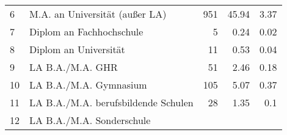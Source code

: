 \begin{longtable}{lXrrr}
     6 &
     \multicolumn{1}{X}{ M.A. an Universität (außer LA)   } &


       \num{951} &
       \num[round-mode=places,round-precision=2]{45,94} &
         \num[round-mode=places,round-precision=2]{3,37} \\

     7 &
     \multicolumn{1}{X}{ Diplom an Fachhochschule   } &


       \num{5} &
       \num[round-mode=places,round-precision=2]{0,24} &
         \num[round-mode=places,round-precision=2]{0,02} \\

     8 &
     \multicolumn{1}{X}{ Diplom an Universität   } &


       \num{11} &
       \num[round-mode=places,round-precision=2]{0,53} &
         \num[round-mode=places,round-precision=2]{0,04} \\

     9 &
     \multicolumn{1}{X}{ LA B.A./M.A. GHR   } &


       \num{51} &
       \num[round-mode=places,round-precision=2]{2,46} &
         \num[round-mode=places,round-precision=2]{0,18} \\

     10 &
     \multicolumn{1}{X}{ LA B.A./M.A. Gymnasium   } &


       \num{105} &
       \num[round-mode=places,round-precision=2]{5,07} &
         \num[round-mode=places,round-precision=2]{0,37} \\

     11 &
     \multicolumn{1}{X}{ LA B.A./M.A. berufsbildende Schulen   } &


       \num{28} &
       \num[round-mode=places,round-precision=2]{1,35} &
         \num[round-mode=places,round-precision=2]{0,1} \\

     12 &
     \multicolumn{1}{X}{ LA B.A./M.A. Sonderschule   } &



\end{longtable}
